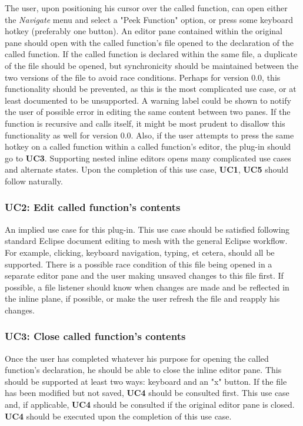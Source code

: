 \documentclass[]{report}
\begin{document}
			The user, upon positioning his cursor over the called function, can open either the \textit{Navigate} menu and select a "Peek Function" option, or press some keyboard hotkey (preferably one button).  An editor pane contained within the original pane should open with the called function's file opened to the declaration of the called function.  If the called function is declared within the same file, a duplicate of the file should be opened, but synchronicity should be maintained between the two versions of the file to avoid race conditions.  Perhaps for version 0.0, this functionality should be prevented, as this is the most complicated use case, or at least documented to be unsupported.  A warning label could be shown to notify the user of possible error in editing the same content between two panes. If the function is recursive and calls itself, it might be most prudent to disallow this functionality as well for version 0.0.  Also, if the user attempts to press the same hotkey on a called function within a called function's editor, the plug-in should go to \textbf{UC3}.  Supporting nested inline editors opens many complicated use cases and alternate states.  Upon the completion of this use case, \textbf{UC1}, \textbf{UC5} should follow naturally.
			
		\subsubsection{UC2:  Edit called function's contents}
		
			An implied use case for this plug-in.  This use case should be satisfied following standard Eclipse document editing to mesh with the general Eclipse workflow.  For example, clicking, keyboard navigation, typing, et cetera, should all be supported.  There is a possible race condition of this file being opened in a separate editor pane and the user making unsaved changes to this file first.  If possible, a file listener should know when changes are made and be reflected in the inline plane, if possible, or make the user refresh the file and reapply his changes.
		
		\subsubsection{UC3:  Close called function's contents}
		
			Once the user has completed whatever his purpose for opening the called function's declaration, he should be able to close the inline editor pane.  This should be supported at least two ways:  keyboard and an "x" button.  If the file has been modified but not saved, \textbf{UC4} should be consulted first.  This use case and, if applicable, \textbf{UC4} should be consulted if the original editor pane is closed.  \textbf{UC4} should be executed upon the completion of this use case.
			
\end{document}
